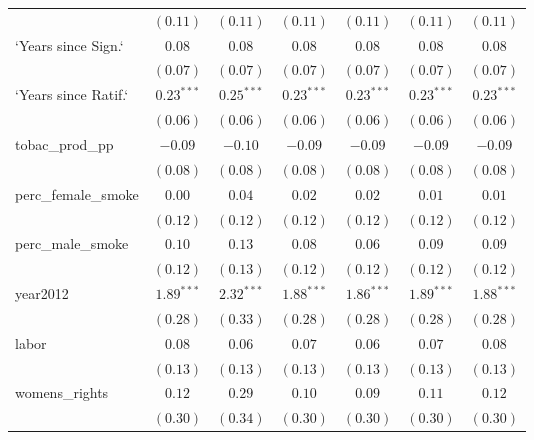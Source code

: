 \begin{table}[!h]
\begin{center}
\begin{tabular}{l c c c c c c }
                        & $(0.11)$     & $(0.11)$     & $(0.11)$     & $(0.11)$     & $(0.11)$     & $(0.11)$     \\
`Years since Sign.`     & $0.08$       & $0.08$       & $0.08$       & $0.08$       & $0.08$       & $0.08$       \\
                        & $(0.07)$     & $(0.07)$     & $(0.07)$     & $(0.07)$     & $(0.07)$     & $(0.07)$     \\
`Years since Ratif.`    & $0.23^{***}$ & $0.25^{***}$ & $0.23^{***}$ & $0.23^{***}$ & $0.23^{***}$ & $0.23^{***}$ \\
                        & $(0.06)$     & $(0.06)$     & $(0.06)$     & $(0.06)$     & $(0.06)$     & $(0.06)$     \\
tobac\_prod\_pp         & $-0.09$      & $-0.10$      & $-0.09$      & $-0.09$      & $-0.09$      & $-0.09$      \\
                        & $(0.08)$     & $(0.08)$     & $(0.08)$     & $(0.08)$     & $(0.08)$     & $(0.08)$     \\
perc\_female\_smoke     & $0.00$       & $0.04$       & $0.02$       & $0.02$       & $0.01$       & $0.01$       \\
                        & $(0.12)$     & $(0.12)$     & $(0.12)$     & $(0.12)$     & $(0.12)$     & $(0.12)$     \\
perc\_male\_smoke       & $0.10$       & $0.13$       & $0.08$       & $0.06$       & $0.09$       & $0.09$       \\
                        & $(0.12)$     & $(0.13)$     & $(0.12)$     & $(0.12)$     & $(0.12)$     & $(0.12)$     \\
year2012                & $1.89^{***}$ & $2.32^{***}$ & $1.88^{***}$ & $1.86^{***}$ & $1.89^{***}$ & $1.88^{***}$ \\
                        & $(0.28)$     & $(0.33)$     & $(0.28)$     & $(0.28)$     & $(0.28)$     & $(0.28)$     \\
labor                   & $0.08$       & $0.06$       & $0.07$       & $0.06$       & $0.07$       & $0.08$       \\
                        & $(0.13)$     & $(0.13)$     & $(0.13)$     & $(0.13)$     & $(0.13)$     & $(0.13)$     \\
womens\_rights          & $0.12$       & $0.29$       & $0.10$       & $0.09$       & $0.11$       & $0.12$       \\
                        & $(0.30)$     & $(0.34)$     & $(0.30)$     & $(0.30)$     & $(0.30)$     & $(0.30)$     \\

\end{tabular}
\end{center}
\end{table}
